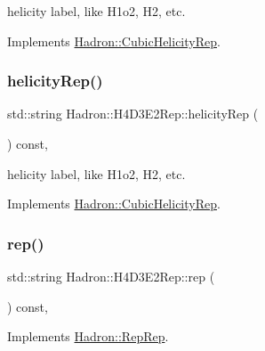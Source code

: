 helicity label, like H1o2, H2, etc. 

Implements \mbox{\hyperlink{structHadron_1_1CubicHelicityRep_af1096946b7470edf0a55451cc662f231}{Hadron\+::\+Cubic\+Helicity\+Rep}}.

\mbox{\label{structHadron_1_1H4D3E2Rep_a79e0c262ae365b9efabe080707d034a8}} 
\subsubsection{\texorpdfstring{helicityRep()}{helicityRep()}\hspace{0.1cm}{\footnotesize\ttfamily [2/2]}}
{\footnotesize\ttfamily std\+::string Hadron\+::\+H4\+D3\+E2\+Rep\+::helicity\+Rep (\begin{DoxyParamCaption}{ }\end{DoxyParamCaption}) const\hspace{0.3cm}{\ttfamily [inline]}, {\ttfamily [virtual]}}

helicity label, like H1o2, H2, etc. 

Implements \mbox{\hyperlink{structHadron_1_1CubicHelicityRep_af1096946b7470edf0a55451cc662f231}{Hadron\+::\+Cubic\+Helicity\+Rep}}.

\mbox{\label{structHadron_1_1H4D3E2Rep_a11d0a71e415f309565e9ca158248aa60}} 
\subsubsection{\texorpdfstring{rep()}{rep()}\hspace{0.1cm}{\footnotesize\ttfamily [1/3]}}
{\footnotesize\ttfamily std\+::string Hadron\+::\+H4\+D3\+E2\+Rep\+::rep (\begin{DoxyParamCaption}{ }\end{DoxyParamCaption}) const\hspace{0.3cm}{\ttfamily [inline]}, {\ttfamily [virtual]}}



Implements \mbox{\hyperlink{structHadron_1_1RepRep_ab3213025f6de249f7095892109575fde}{Hadron\+::\+Rep\+Rep}}.

\mbox{\label{structHadron_1_1H4D3E2Rep_a11d0a71e415f309565e9ca158248aa60}} 
